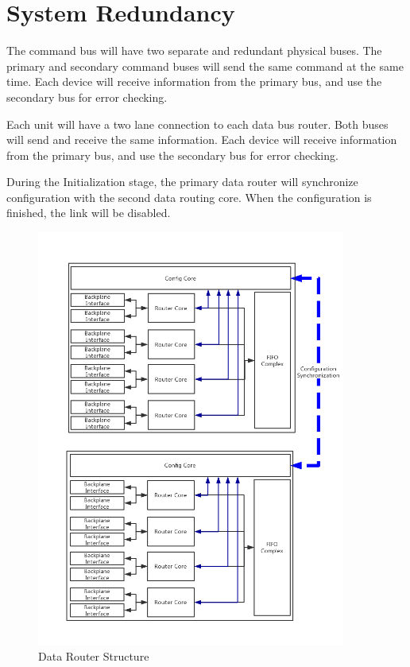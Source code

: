 \documentclass[12pt,article]{memoir}
\begin{document}
\section{System Redundancy}
The command bus will have two separate and redundant physical buses. The primary and secondary command buses will send the same command at the same time. Each device will receive information from the primary bus, and use the secondary bus for error checking.\par
Each unit will have a two lane connection to each data bus router. Both buses will send and receive the same information. Each device will receive information from the primary bus, and use the secondary bus for error checking.\par
During the Initialization stage, the primary data router will synchronize configuration with the second data routing core. When the configuration is finished, the link will be disabled.
\begin{figure}[H]
\begin{center}
	\centering
	\includegraphics[width=4.0in]{img/DR00001_SpaceWire_2.png}
	\caption{Data Router Structure}
\end{center}
\end{figure}

\newpage
\end{document}

